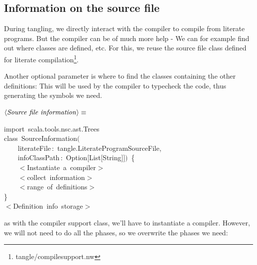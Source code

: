 \documentclass[a4paper,12pt]{article}
\begin{document}
\subsection{Information on the source file}
During tangling, we directly interact with the compiler to compile from literate
programs. But the compiler can be of much more help - We can for example find
out where classes are defined, etc. For this, we reuse the source file class
defined for literate compilation\footnote{tangle/compilesupport.nw}.

Another optional parameter is where to find the classes containing
the other definitions: This will be used by the compiler to typecheck
the code, thus generating the symbols we need.

$\left<\mbox{\emph{Source file information}}\right>\equiv$
\begin{program}{\vem import}~scala.tools.nsc.ast.Trees
\\{\vem class}~SourceInformation$($
\\~~~~literateFile\,{\rm :}~tangle.LiterateProgramSourceFile,
\\~~~~infoClassPath\,{\rm :}~Option$[$List$[$String$]$$]$$)$~{\small\{}
\\~~~~$<$Instantiate~a~compiler$>$
\\[0.5em]~~~~$<$collect~information$>$
\\~~~~$<$range~of~definitions$>$
\\{\small\}}
\\[0.5em]$<$Definition~info~storage$>$
\\[0.5em]\end{program}



as with the compiler support class, we'll have to instantiate
a compiler. However, we will not need to do all the phases,
so we overwrite the phases we need:
\end{document}
